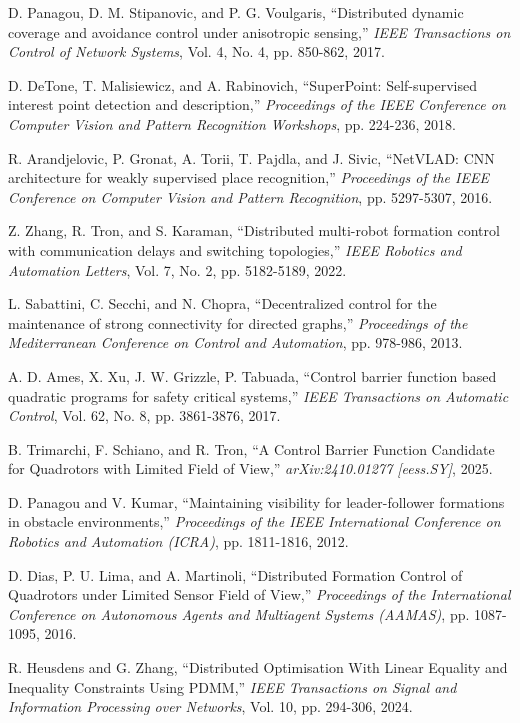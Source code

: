\documentclass[fleqn,10pt,twocolumn]{SICE_FES25}
\theoremstyle{definition}
\theoremstyle{plain}
\begin{document}
\begin{thebibliography}{9}
D. Panagou, D. M. Stipanovic, and P. G. Voulgaris, ``Distributed dynamic coverage and avoidance control under anisotropic sensing,'' {\it IEEE Transactions on Control of Network Systems}, Vol. 4, No. 4, pp. 850-862, 2017.

D. DeTone, T. Malisiewicz, and A. Rabinovich, ``SuperPoint: Self-supervised interest point detection and description,'' {\it Proceedings of the IEEE Conference on Computer Vision and Pattern Recognition Workshops}, pp. 224-236, 2018.

R. Arandjelovic, P. Gronat, A. Torii, T. Pajdla, and J. Sivic, ``NetVLAD: CNN architecture for weakly supervised place recognition,'' {\it Proceedings of the IEEE Conference on Computer Vision and Pattern Recognition}, pp. 5297-5307, 2016.

Z. Zhang, R. Tron, and S. Karaman, ``Distributed multi-robot formation control with communication delays and switching topologies,'' {\it IEEE Robotics and Automation Letters}, Vol. 7, No. 2, pp. 5182-5189, 2022.

L. Sabattini, C. Secchi, and N. Chopra, ``Decentralized control for the maintenance of strong connectivity for directed graphs,'' {\it Proceedings of the Mediterranean Conference on Control and Automation}, pp. 978-986, 2013.

A. D. Ames, X. Xu, J. W. Grizzle, P. Tabuada, ``Control barrier function based quadratic programs for safety critical systems,'' {\it IEEE Transactions on Automatic Control}, Vol. 62, No. 8, pp. 3861-3876, 2017.


B. Trimarchi, F. Schiano, and R. Tron, ``A Control Barrier Function Candidate for Quadrotors with Limited Field of View,'' {\it arXiv:2410.01277 [eess.SY]}, 2025.

D. Panagou and V. Kumar, ``Maintaining visibility for leader-follower formations in obstacle environments,'' {\it Proceedings of the IEEE International Conference on Robotics and Automation (ICRA)}, pp. 1811-1816, 2012.

D. Dias, P. U. Lima, and A. Martinoli, ``Distributed Formation Control of Quadrotors under Limited Sensor Field of View,'' {\it Proceedings of the International Conference on Autonomous Agents and Multiagent Systems (AAMAS)}, pp. 1087-1095, 2016.

R. Heusdens and G. Zhang, ``Distributed Optimisation With Linear Equality and Inequality Constraints Using PDMM,'' {\it IEEE Transactions on Signal and Information Processing over Networks}, Vol. 10, pp. 294-306, 2024.

\end{thebibliography}
\end{document}
